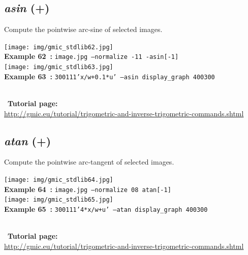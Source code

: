 \documentclass[a4paper,10.5pt,twoside]{book}
\def\comma{\discretionary{,}{}{,}}
\begin{document}
\subsection{\emph{asin} (+)}\vspace*{-0.7em}
Compute the pointwise arc-sine of selected images.
\begin{center}\texttt{[image: img/gmic\_stdlib62.jpg]}\\
{\footnotesize \textbf{Example 62~:} \texttt{image.jpg --normalize -1{\comma}1 -asin[-1]}}
\\\texttt{[image: img/gmic\_stdlib63.jpg]}\\
{\footnotesize \textbf{Example 63~:} \texttt{300{\comma}1{\comma}1{\comma}1{\comma}'x/w+0.1*u' --asin display\_graph 400{\comma}300}}
\end{center}
~\\
~\textbf{Tutorial page: }\\\url{http://gmic.eu/tutorial/trigometric-and-inverse-trigometric-commands.shtml}


\subsection{\emph{atan} (+)}\vspace*{-0.7em}
Compute the pointwise arc-tangent of selected images.
\begin{center}\texttt{[image: img/gmic\_stdlib64.jpg]}\\
{\footnotesize \textbf{Example 64~:} \texttt{image.jpg --normalize 0{\comma}8 atan[-1]}}
\\\texttt{[image: img/gmic\_stdlib65.jpg]}\\
{\footnotesize \textbf{Example 65~:} \texttt{300{\comma}1{\comma}1{\comma}1{\comma}'4*x/w+u' --atan display\_graph 400{\comma}300}}
\end{center}
~\\
~\textbf{Tutorial page: }\\\url{http://gmic.eu/tutorial/trigometric-and-inverse-trigometric-commands.shtml}
\end{document}
